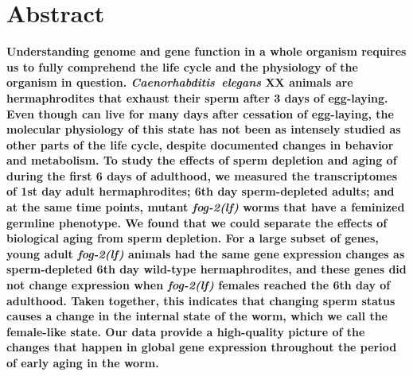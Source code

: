 \newcommand{\fog}{\emph{\mbox{fog-2(lf)}}}

\newcommand{\fogn}{1,881}
\newcommand{\agen}{5,592}
\newcommand{\interactionn}{1,318}
\newcommand{\coexpressed}{905}
\newcommand{\intersectn}{1,040}
\newcommand{\femalen}{405}

\newcommand{\tfaging}{145}
\newcommand{\tffog}{60}
\newcommand{\tfinteraction}{36}

\newcommand{\goldn}{1,056}
\newcommand{\goldfound}{506}
\newcommand{\goldpval}{$<10^{-38}$}

\newcommand{\website}{
            \url{https://wormlabcaltech.github.io/Angeles_Leighton_2016/}
            }
\newcommand{\webref}{
\href{https://wormlabcaltech.github.io/Angeles_Leighton_2016/}{website}}


\section*{Abstract}
\textbf{
  Understanding genome and gene function in a whole organism requires us to
  fully comprehend the life cycle and the physiology of the organism in
  question. \emph{Caenorhabditis~elegans} XX animals are hermaphrodites that
  exhaust their sperm after 3 days of egg-laying. Even though \cel{} can live
  for many days after cessation of egg-laying, the molecular physiology of this
  state has not been as intensely studied as other parts of the life cycle,
  despite documented changes in behavior and metabolism. To study the effects of
  sperm depletion and aging of \cel{} during the first 6 days of adulthood, we
  measured the transcriptomes of 1st day adult hermaphrodites; 6th day
  sperm-depleted adults; and at the same time points, mutant \fog{} worms that
  have a feminized germline phenotype. We found that we could separate the
  effects of biological aging from sperm depletion. For a large subset of genes,
  young adult \fog{} animals had the same gene expression changes as
  sperm-depleted 6th day wild-type hermaphrodites, and these genes did not
  change expression when \fog{} females reached the 6th day of adulthood. Taken
  together, this indicates that changing sperm status causes a change in the
  internal state of the worm, which we call the female-like state. Our data
  provide a high-quality picture of the changes that happen in global gene
  expression throughout the period of early aging in the worm.
}
\vspace{10mm}


